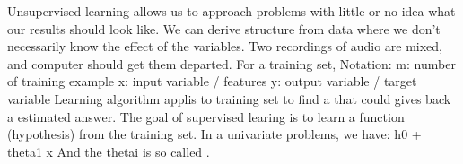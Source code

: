 {}Unsupervised learning allows us to approach problems with little or no idea what our results should look like. We can derive structure from data where we don’t necessarily know the effect of the variables.\markdownRendererInterblockSeparator
{}Two recordings of audio are mixed, and computer should get them departed.\markdownRendererInterblockSeparator
{}\markdownRendererInterblockSeparator
{}\markdownRendererInterblockSeparator
{}For a training set, Notation:\markdownRendererInterblockSeparator
{}\markdownRendererUlBegin
\markdownRendererUlItem \markdownRendererDollarSign{}m\markdownRendererDollarSign{}: number of training example\markdownRendererUlItemEnd 
\markdownRendererUlItem \markdownRendererDollarSign{}x\markdownRendererDollarSign{}: input variable / features\markdownRendererUlItemEnd 
\markdownRendererUlItem \markdownRendererDollarSign{}y\markdownRendererDollarSign{}: output variable / target variable\markdownRendererUlItemEnd 
\markdownRendererUlEnd \markdownRendererInterblockSeparator
{}Learning algorithm applis to training set to find a  that could gives back a estimated answer.\markdownRendererInterblockSeparator
{}The goal of supervised learing is to learn a function (hypothesis) from the training set.\markdownRendererInterblockSeparator
{}\markdownRendererInterblockSeparator
{}In a univariate problems, we have:\markdownRendererInterblockSeparator
{}\markdownRendererDollarSign{}\markdownRendererDollarSign{}h0 + \markdownRendererBackslash{}theta\markdownRendererUnderscore{}1 x\markdownRendererDollarSign{}\markdownRendererDollarSign{}\markdownRendererInterblockSeparator
{}And the \markdownRendererDollarSign{}\markdownRendererBackslash{}theta\markdownRendererUnderscore{}i\markdownRendererDollarSign{} is so called .\markdownRendererInterblockSeparator
{}\markdownRendererInterblockSeparator
{}\relax